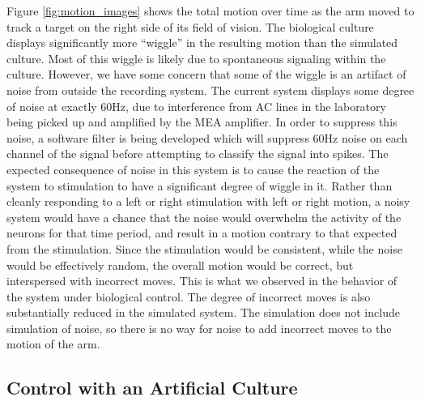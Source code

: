 \documentclass[letterpaper]{article}
\begin{document}
Figure \ref{fig:motion_images} shows the total motion over time as the arm moved to track a target on the right side of its field of vision. 
The biological culture displays significantly more ``wiggle'' in the resulting motion than the simulated culture.
Most of this wiggle is likely due to spontaneous signaling within the culture.
However, we have some concern that some of the wiggle is an artifact of noise from outside the recording system. 
The current system displays some degree of noise at exactly 60Hz, due to interference from AC lines in the laboratory being picked up and amplified by the MEA amplifier. 
In order to suppress this noise, a software filter is being developed which will suppress 60Hz noise on each channel of the signal before attempting to classify the signal into spikes. 
The expected consequence of noise in this system is to cause the reaction of the system to stimulation to have a significant degree of wiggle in it. 
Rather than cleanly responding to a left or right stimulation with left or right motion, a noisy system would have a chance that the noise would overwhelm the activity of the neurons for that time period, and result in a motion contrary to that expected from the stimulation. 
Since the stimulation would be consistent, while the noise would be effectively random, the overall motion would be correct, but interspersed with incorrect moves. 
This is what we observed in the behavior of the system under biological control.
The degree of incorrect moves is also substantially reduced in the simulated system.
The simulation does not include simulation of noise, so there is no way for noise to add incorrect moves to the motion of the arm. 

\subsection{Control with an Artificial Culture}
\end{document}
